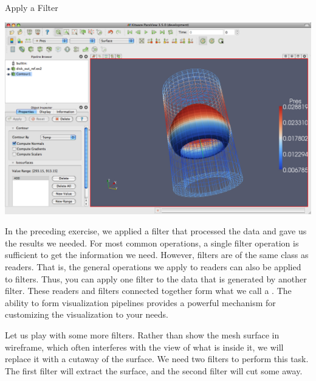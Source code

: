 \begin{exercise}{Apply a Filter}
  \begin{inlinefig}
    \includegraphics[width=\scw]{images/ContourResults}
  \end{inlinefig}
\end{exercise}

In the preceding exercise, we applied a filter that processed the data and
gave us the results we needed.  For most common operations, a single filter
operation is sufficient to get the information we need.  However, filters
are of the same class as readers.  That is, the general operations we apply
to readers can also be applied to filters.  Thus, you can apply one filter
to the data that is generated by another filter.  These readers and filters
connected together form what we call a .
The ability to form visualization pipelines provides a powerful mechanism
for customizing the visualization to your needs.

Let us play with some more filters.  Rather than show the mesh surface in
wireframe, which often interferes with the view of what is inside it, we
will replace it with a cutaway of the surface.  We need two filters to
perform this task.  The first filter will extract the surface, and the
second filter will cut some away.

